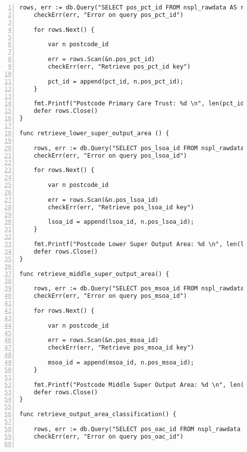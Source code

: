 \begin{lstlisting}[breaklines, frame=single, numbers=left, caption={Resource Table Key Retrieval Function.}, label=commandline-02]
	rows, err := db.Query("SELECT pos_pct_id FROM nspl_rawdata AS rawdata JOIN postcode_primary_care_trust AS pct ON pct.pos_pct_code = rawdata.pctc AND pct.pos_pct_name = rawdata.pctn;" )
	checkErr(err, "Error on query pos_pct_id")	 
	
	for rows.Next() {
	
		var n postcode_id
		
		err = rows.Scan(&n.pos_pct_id)
		checkErr(err, "Retrieve pos_pct_id key")
		
		pct_id = append(pct_id, n.pos_pct_id); 
	}
	
	fmt.Printf("Postcode Primary Care Trust: %d \n", len(pct_id))
	defer rows.Close()
}

func retrieve_lower_super_output_area () {
	
	rows, err := db.Query("SELECT pos_lsoa_id FROM nspl_rawdata AS rawdata JOIN postcode_lower_super_output_area AS lsoa ON lsoa.pos_lsoa_code = rawdata.isoac AND lsoa.pos_lsoa_name = rawdata.isoan;" )
	checkErr(err, "Error on query pos_lsoa_id")	 
	
	for rows.Next() {
	
		var n postcode_id
		
		err = rows.Scan(&n.pos_lsoa_id)
		checkErr(err, "Retrieve pos_lsoa_id key")
		
		lsoa_id = append(lsoa_id, n.pos_lsoa_id); 
	}

	fmt.Printf("Postcode Lower Super Output Area: %d \n", len(lsoa_id))
	defer rows.Close()
}

func retrieve_middle_super_output_area() {

	rows, err := db.Query("SELECT pos_msoa_id FROM nspl_rawdata AS rawdata JOIN postcode_middle_super_output_area AS msoa ON msoa.pos_msoa_code = rawdata.msoac AND msoa.pos_msoa_name = rawdata.msoan;" )
	checkErr(err, "Error on query pos_msoa_id")	 
	
	for rows.Next() {
	
		var n postcode_id
		
		err = rows.Scan(&n.pos_msoa_id)
		checkErr(err, "Retrieve pos_msoa_id key")
		
		msoa_id = append(msoa_id, n.pos_msoa_id); 
	}

	fmt.Printf("Postcode Middle Super Output Area: %d \n", len(msoa_id))
	defer rows.Close()
}

func retrieve_output_area_classification() {

	rows, err := db.Query("SELECT pos_oac_id FROM nspl_rawdata AS rawdata JOIN postcode_output_area_classification AS oac ON oac.pos_oac_code = rawdata.oacc AND oac.pos_oac_name = rawdata.oacn;" )
	checkErr(err, "Error on query pos_oac_id")	 
	

\end{lstlisting}
